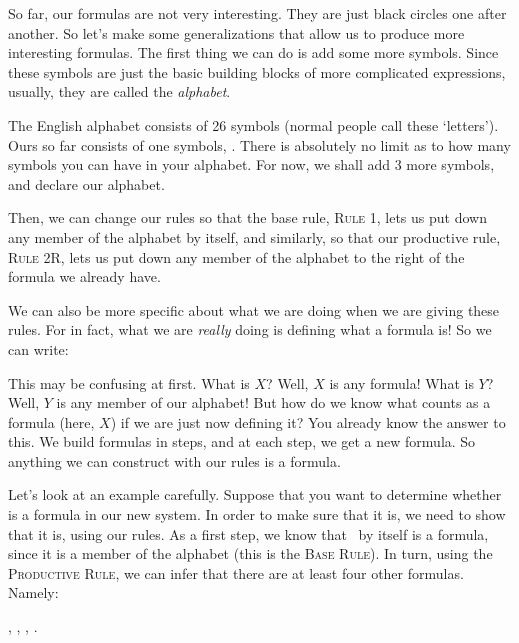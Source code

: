 So far, our formulas are not very interesting. They are just black circles one after another. So let's make some generalizations that allow us to produce more interesting formulas. The first thing we can do is add some more symbols. Since these symbols are just the basic building blocks of more complicated expressions, usually, they are called the \textit{alphabet}. 

The English alphabet consists of 26 symbols (normal people call these `letters'). Ours so far consists of one symbols, \bcirc. There is absolutely no limit as to how many symbols you can have in your alphabet. For now, we shall add 3 more symbols, and declare our alphabet.


Then, we can change our rules so that the base rule, \textsc{Rule 1}, lets us put down any member of the alphabet by itself, and similarly, so that our productive rule, \textsc{Rule 2R}, lets us put down any member of the alphabet to the right of the formula we already have. 

We can also be more specific about what we are doing when we are giving these rules. For in fact, what we are \textit{really} doing is defining what a formula is! So we can write:



This may be confusing at first. What is $X$? Well, $X$ is any formula! What is $Y$? Well, $Y$ is any member of our alphabet! But how do we know what counts as a formula (here, $X$) if we are just now defining it? You already know the answer to this. We build formulas in steps, and at each step, we get a new formula. So anything we can construct with our rules is a formula. 

Let's look at an example carefully. Suppose that you want to determine whether \bbox\bcirc\bbox\btri{} is a formula in our new system. In order to make sure that it is, we need to show that it is, using our rules. As a first step, we know that \bbox\ by itself is a formula, since it is a member of the alphabet (this is the \textsc{Base Rule}). In turn, using the \textsc{Productive Rule}, we can infer that there are at least four other formulas. Namely:
\begin{center}
	\bbox\bcirc, \bbox\btri, \bbox\bstar, \bbox\bbox.
\end{center}

